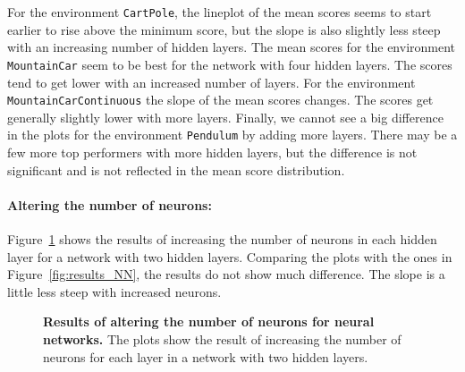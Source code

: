 For the environment \verb|CartPole|, the lineplot of the mean scores seems to start earlier to rise above the minimum score, but the slope is also slightly less steep with an increasing number of hidden layers. The mean scores for the environment \verb|MountainCar| seem to be best for the network with four hidden layers. The scores tend to get lower with an increased number of layers. For the environment \verb|MountainCarContinuous| the slope of the mean scores changes. The scores get generally slightly lower with more layers. Finally, we cannot see a big difference in the plots for the environment \verb|Pendulum| by adding more layers. There may be a few more top performers with more hidden layers, but the difference is not significant and is not reflected in the mean score distribution.

\paragraph{Altering the number of neurons:} Figure~\ref{fig:experiment_2_neurons} shows the results of increasing the number of neurons in each hidden layer for a network with two hidden layers. Comparing the plots with the ones in Figure~\ref{fig:results_NN}, the results do not show much difference. The slope is a little less steep with increased neurons.
\begin{figure}[!ht]
\begin{figrow}
\item \label{row:NN_with_bias_neurons} 
\item \label{row:NN_without_neurons}  
\end{figrow}
\caption[Results of altering the number of neurons for neural networks]{
  \textbf{Results of altering the number of neurons for neural networks.}
  The plots show the result of increasing the number of neurons for each layer in a network with two hidden layers.
}
\label{fig:experiment_2_neurons}
\end{figure}


